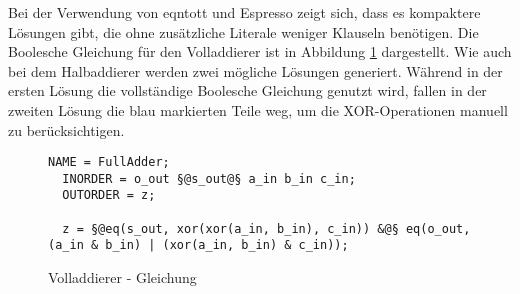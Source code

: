 Bei der Verwendung von eqntott und Espresso zeigt sich, dass es kompaktere Lösungen gibt, die ohne zusätzliche Literale weniger Klauseln benötigen.
Die Boolesche Gleichung für den Volladdierer ist in Abbildung \ref{fig:fulladder_qen} dargestellt. Wie auch bei dem Halbaddierer werden zwei mögliche
Lösungen generiert. Während in der ersten Lösung die vollständige Boolesche Gleichung genutzt wird, fallen in der zweiten Lösung die blau markierten
Teile weg, um die XOR-Operationen manuell zu berücksichtigen. \clearpage
\begin{figure}[!h]
  \centering
  \begin{lstlisting}[]
  NAME = FullAdder;
  INORDER = o_out §@s_out@§ a_in b_in c_in;
  OUTORDER = z;

  z = §@eq(s_out, xor(xor(a_in, b_in), c_in)) &@§ eq(o_out, (a_in & b_in) | (xor(a_in, b_in) & c_in));
  \end{lstlisting}
  \caption{Volladdierer - Gleichung}
  \label{fig:fulladder_qen}
\end{figure}

